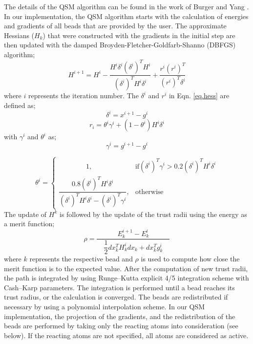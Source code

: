 \documentclass[12pt]{report}
\begin{document}
The details of the QSM 
algorithm can be found in the 
work of Burger and Yang \cite{Burger2006}. 
In our implementation, 
the QSM algorithm starts with the calculation of  
energies and gradients of all beads 
that are provided by the user.  
The approximate Hessians ($H_{k}$) that were 
constructed with the gradients in the initial step 
are then updated with the
damped Broyden-Fletcher-Goldfarb-Shanno (DBFGS) algorithm; 
\begin{equation}
H^{i+1} = H^{i} - 
\dfrac{H^{i}\delta^{i}(\delta^{i})^{T}H^{i}}
{(\delta^{i})^{T}H^{i}\delta^{i}} + 
\dfrac{r^{i}(r^{i})^{T}}
{(r^{i})^{T}\delta^{i}}
\label{eq.hess}
\end{equation}
where $i$ represents the iteration number. 
The $\delta^{i}$ and $r^{i}$ in Eqn. \ref{eq.hess} 
are defined as;
\begin{equation}
\delta^{i} = x^{i+1} - g^{i}
\end{equation}
\begin{equation}
r_{i} = \theta^{i} \gamma^{i} + (1-\theta^{i})H^{i}\delta^{i}
\end{equation}
with $\gamma^{i}$ and $\theta^{i}$ as;
\begin{equation}
\gamma^{i} = g^{i+1} - g^{i}
\end{equation}

\begin{equation}
\theta^{i}=
\begin{cases}
\qquad \qquad 1, & \text{if} (\delta^{i})^{T}\gamma^{i} > 0.2(\delta^{i})^{T}H^{i}\delta^{i} \\
\dfrac{0.8(\delta^{i})^{T} H^{i} \delta^{i}} 
{(\delta^{i})^{T} H^{i} \delta^{i} - 
(\delta^{i})^{T} \gamma^{i}}, & \text{otherwise}
\end{cases}
\end{equation}
The update of $H^{k}$ is followed by 
the update of the trust radii 
using the energy as a merit function;
\begin{equation}
\rho = \dfrac{E_{k}^{i+1} - E_{k}^{i}}
{\quad \dfrac{1}{2} dx_{k}^{T} H_{k}^{i} dx_{k} 
+
dx_{k}^{T}g_{k}^{i} \quad}
\end{equation}
where $k$ represents the respective bead 
and $\rho$ is used 
to compute how close the merit function is to the expected value. 
After the computation of new trust radii, the path is integrated 
by using Runge--Kutta explicit 4/5 integration scheme 
with Cash--Karp parameters. The integration is performed 
until a bead  
reaches its trust radius, or the calculation is converged. 
The beads are redistributed if necessary by using 
a polynomial interpolation scheme. 
In our QSM implementation, 
the projection of the gradients, and the 
redistribution of the beads are performed 
by taking only the reacting atoms into consideration (see below). 
If the reacting atoms are not specified, 
all atoms are considered as active. 
\end{document}
